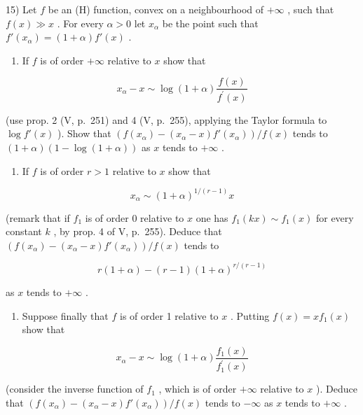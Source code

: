 15) Let \(f\) be an (H) function, convex on a neighbourhood of \(+\infty\) , such that \(f(x) \gg x\) . For every \(\alpha > 0\) let \(x_{\alpha}\) be the point such that \(f'(x_{\alpha}) = (1 + \alpha)f'(x)\) .

\begin{enumerate}
\def\labelenumi{\alph{enumi})}
\tightlist
\item
  If \(f\) is of order \(+\infty\) relative to \(x\) show that
\end{enumerate}

\[
x _ {\alpha} - x \sim \log (1 + \alpha) \frac {f (x)}{f ^ {\prime} (x)}
\]

(use prop. 2 (V, p.~251) and 4 (V, p.~255), applying the Taylor formula to \(\log f'(x)\) ). Show that \(\left(f(x_{\alpha}) - (x_{\alpha} - x)f'(x_{\alpha})\right)/f(x)\) tends to \((1 + \alpha)\left(1 - \log(1 + \alpha)\right)\) as \(x\) tends to \(+\infty\) .

\begin{enumerate}
\def\labelenumi{\alph{enumi})}
\setcounter{enumi}{1}
\tightlist
\item
  If \(f\) is of order \(r > 1\) relative to \(x\) show that
\end{enumerate}

\[
x _ {\alpha} \sim (1 + \alpha) ^ {1 / (r - 1)} x
\]

(remark that if \(f_{1}\) is of order 0 relative to \(x\) one has \(f_{1}(kx) \sim f_{1}(x)\) for every constant \(k\) , by prop. 4 of V, p.~255). Deduce that \(\left(f(x_{\alpha}) - (x_{\alpha} - x)f'(x_{\alpha})\right) / f(x)\) tends to

\[
r (1 + \alpha) - (r - 1) (1 + \alpha) ^ {r / (r - 1)}
\]

as \(x\) tends to \(+\infty\) .

\begin{enumerate}
\def\labelenumi{\alph{enumi})}
\setcounter{enumi}{2}
\tightlist
\item
  Suppose finally that \(f\) is of order 1 relative to \(x\) . Putting \(f(x) = xf_1(x)\) show that
\end{enumerate}

\[
x _ {\alpha} - x \sim \log (1 + \alpha) \frac {f _ {1} (x)}{f _ {1} ^ {\prime} (x)}
\]

(consider the inverse function of \(f_{1}\) , which is of order \(+\infty\) relative to \(x\) ). Deduce that \(\left(f(x_{\alpha}) - (x_{\alpha} - x)f'(x_{\alpha})\right) / f(x)\) tends to \(-\infty\) as \(x\) tends to \(+\infty\) .

